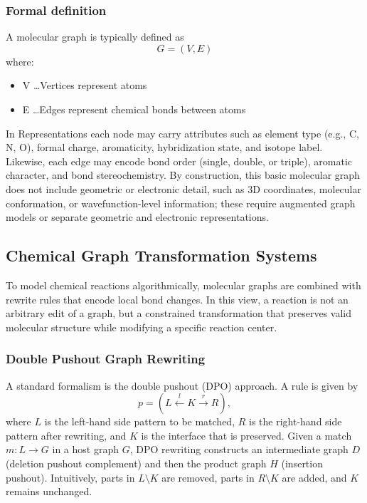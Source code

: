 \subsubsection{Formal definition}

A molecular graph is typically defined as \cite[p.~2]{Ehrlich2012} \cite[p.~3]{Fujita2025}
\begin{equation}
    \label{eq:mol-graph}
    G = (V, E)
\end{equation}
where:
\begin{itemize}
    \item V \ldots Vertices represent atoms
    \item E \ldots Edges represent chemical bonds between atoms
\end{itemize}

In Representations each node may carry attributes such as element type (e.g., C, N, O), formal charge, aromaticity, hybridization state, and isotope label.
Likewise, each edge may encode bond order (single, double, or triple), aromatic character, and bond stereochemistry. \cite[pp.~4--5]{Wojtuch2023}
By construction, this basic molecular graph does not include geometric or electronic detail, such as 3D coordinates, molecular conformation, or wavefunction-level information; these require augmented graph models or separate geometric and electronic representations.
\cite[pp.~3--4]{Wojtuch2023} \cite[p.~595]{Kearnes2016}



\subsection{Chemical Graph Transformation Systems}
To model chemical reactions algorithmically, molecular graphs are combined with rewrite rules that encode local bond changes. \cite[p.~76]{Echahed2016}
In this view, a reaction is not an arbitrary edit of a graph, but a constrained transformation that preserves valid molecular structure while modifying a specific reaction center. \cite[p.~2]{Andersen2013} \cite[p.~6]{Abel2026}

\subsubsection{Double Pushout Graph Rewriting}
A standard formalism is the double pushout (DPO) approach. \cite[p.~3]{Andersen2013} A rule is given by
\[
p = (L \xleftarrow{l} K \xrightarrow{r} R),
\]
where \(L\) is the left-hand side pattern to be matched, \(R\) is the right-hand side pattern after rewriting, and \(K\) is the interface that is preserved. \cite[p.~75]{Echahed2016}
Given a match \(m:L\to G\) in a host graph \(G\), DPO rewriting constructs an intermediate graph \(D\) (deletion pushout complement) \cite[p.~680]{HABEL2001}and then the product graph \(H\) (insertion pushout).
Intuitively, parts in \(L\setminus K\) are removed, parts in \(R\setminus K\) are added, and \(K\) remains unchanged. \cite[p.~3]{Andersen2013} \cite[p.~4]{Flamm2025}


